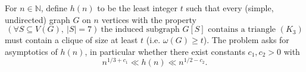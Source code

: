 For $n\in\mathbb{N}$, define $h(n)$ to be the least integer $t$ such that every (simple, undirected) graph $G$ on $n$ vertices with the property
\[
(\forall S\subseteq V(G),\ |S|=7)\ \text{the induced subgraph }G[S]\text{ contains a triangle }(K_3)
\]
must contain a clique of size at least $t$ (i.e. $\omega(G)\ge t$).
The problem asks for asymptotics of $h(n)$, in particular whether there exist constants $c_1,c_2>0$ with
\[
n^{1/3+c_1} \ll h(n) \ll n^{1/2-c_2}.
\]

